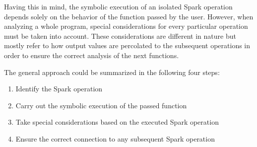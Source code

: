 Having this in mind, the symbolic execution of an isolated Spark operation depends solely on the behavior of the function passed by the user. However, when analyzing a whole program, special considerations for every particular operation must be taken into account. These considerations are different in nature but mostly refer to how output values are percolated to the subsequent operations in order to ensure the correct analysis of the next functions.

The general approach could be summarized in the following four steps:
\begin{enumerate}
	\item Identify the Spark operation
	\item Carry out the symbolic execution of the passed function
	\item Take special considerations based on the executed Spark operation
	\item Ensure the correct connection to any subsequent Spark operation
\end{enumerate}





